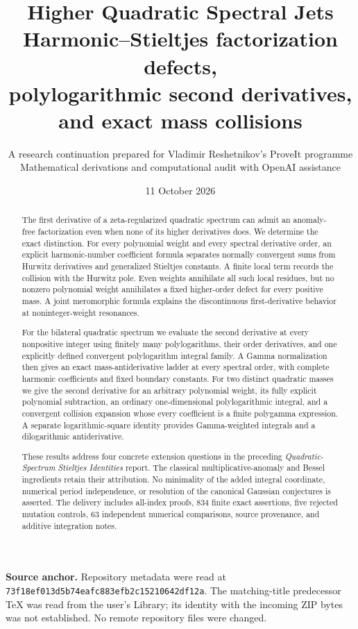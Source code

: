 \documentclass[11pt,letterpaper]{article}
\title{\textbf{Higher Quadratic Spectral Jets}\\[7pt]
\large Harmonic--Stieltjes factorization defects,\\
polylogarithmic second derivatives, and exact mass collisions}
\author{A research continuation prepared for Vladimir Reshetnikov's ProveIt programme\\
\small Mathematical derivations and computational audit with OpenAI assistance}
\date{11 October 2026}
\numberwithin{equation}{section}
\theoremstyle{definition}
\newcommand{\pin}{\nolinkurl{73f18ef013d5b74eafc883efb2c15210642df12a}}
\begin{document}
\maketitle
\thispagestyle{plain}
\begin{abstract}
The first derivative of a zeta-regularized quadratic spectrum can admit an
anomaly-free factorization even when none of its higher derivatives does.
We determine the exact distinction. For every polynomial weight and every
spectral derivative order, an explicit harmonic-number coefficient formula
separates normally convergent sums from Hurwitz derivatives and generalized
Stieltjes constants. A finite local term records the collision with the
Hurwitz pole. Even weights annihilate all such local residues, but no
nonzero polynomial weight annihilates a fixed higher-order defect for every
positive mass. A joint meromorphic formula explains the discontinuous
first-derivative behavior at noninteger-weight resonances.

For the bilateral quadratic spectrum we evaluate the second derivative at
every nonpositive integer using finitely many polylogarithms, their order
derivatives, and one explicitly defined convergent polylogarithm integral
family. A Gamma normalization then gives an exact mass-antiderivative
ladder at every spectral order, with complete harmonic coefficients and
fixed boundary constants. For two distinct quadratic masses we give the
second derivative for an arbitrary polynomial weight, its fully explicit
polynomial subtraction, an ordinary one-dimensional polylogarithmic
integral, and a convergent collision expansion whose every coefficient is
a finite polygamma expression. A separate logarithmic-square identity
provides Gamma-weighted integrals and a dilogarithmic antiderivative.

These results address four concrete extension questions in the preceding
\emph{Quadratic-Spectrum Stieltjes Identities} report. The classical
multiplicative-anomaly and Bessel ingredients retain their attribution.
No minimality of the added integral coordinate, numerical period
independence, or resolution of the canonical Gaussian conjectures is
asserted. The delivery includes all-index proofs, 834 finite exact
assertions, five rejected mutation controls, 63 independent numerical
comparisons, source provenance, and additive integration notes.
\end{abstract}
\medskip
\noindent\textbf{Source anchor.} Repository metadata were read at \pin.
The matching-title predecessor TeX was read from the user's Library;
its identity with the incoming ZIP bytes was not established. No remote
repository files were changed.
\clearpage
\begingroup\small\tableofcontents\endgroup
\clearpage
\end{document}
